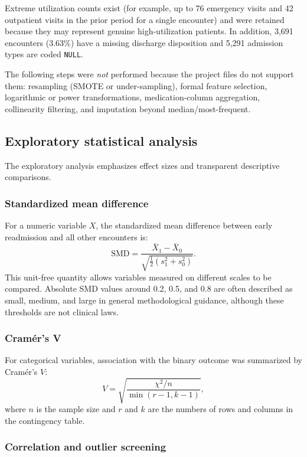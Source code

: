 \documentclass[10pt,a4paper]{article}
\begin{document}
Extreme utilization counts exist (for example, up to 76 emergency visits and 42 outpatient visits in the prior period for a single encounter) and were retained because they may represent genuine high-utilization patients. In addition, 3,691 encounters (3.63\%) have a missing discharge disposition and 5,291 admission types are coded \texttt{NULL}.

The following steps were \emph{not} performed because the project files do not support them: resampling (SMOTE or under-sampling), formal feature selection, logarithmic or power transformations, medication-column aggregation, collinearity filtering, and imputation beyond median/most-frequent.

\subsection{Exploratory statistical analysis}

The exploratory analysis emphasizes effect sizes and transparent descriptive comparisons.

\subsubsection{Standardized mean difference}

For a numeric variable $X$, the standardized mean difference between early readmission and all other encounters is:
\[
\mathrm{SMD}
=
\frac{\bar X_1-\bar X_0}
{\sqrt{\frac{1}{2}(s_1^2+s_0^2)}}.
\]
This unit-free quantity allows variables measured on different scales to be compared. Absolute SMD values around 0.2, 0.5, and 0.8 are often described as small, medium, and large in general methodological guidance, although these thresholds are not clinical laws.

\subsubsection{Cramér's V}

For categorical variables, association with the binary outcome was summarized by Cramér's $V$:
\[
V=
\sqrt{
\frac{\chi^2/n}
{\min(r-1,k-1)}
},
\]
where $n$ is the sample size and $r$ and $k$ are the numbers of rows and columns in the contingency table.

\subsubsection{Correlation and outlier screening}
\end{document}
